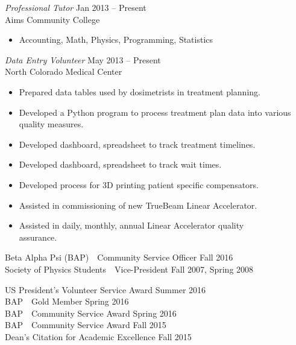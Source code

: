 \documentclass{article}
\begin{document}
\begin{description}[leftmargin=!,labelwidth=3cm]
{\sl Professional Tutor} \hfill Jan 2013 -- Present\\Aims Community College
\begin{itemize}[rightmargin=4.3cm]
    \item Accounting, Math, Physics, Programming, Statistics
\end{itemize}

{\sl Data Entry Volunteer} \hfill May 2013 -- Present\\North Colorado Medical Center
\begin{itemize}[rightmargin=4.3cm]
    \item Prepared data tables used by dosimetrists in treatment planning.
    \item Developed a Python program to process treatment plan data into various quality measures.
    \item Developed dashboard, spreadsheet to track treatment timelines.
    \item Developed dashboard, spreadsheet to track wait times.
    \item Developed process for 3D printing patient specific compensators.
    \item Assisted in commissioning of new TrueBeam Linear Accelerator.
    \item Assisted in daily, monthly, annual Linear Accelerator quality \\ assurance.
\end{itemize}

\item[Leadership]
Beta Alpha Psi (BAP)\ \ Community Service Officer \hfill Fall 2016\\
Society of Physics Students\ \ Vice-President \hfill Fall 2007, Spring 2008

\item[Awards]
US President's Volunteer Service Award \hfill Summer 2016\\
BAP\ \ Gold Member \hfill Spring 2016\\
BAP\ \ Community Service Award \hfill Spring 2016\\
BAP\ \ Community Service Award \hfill   Fall 2015\\
Dean's Citation for Academic Excellence \hfill Fall 2015



\end{description}
\end{document}
